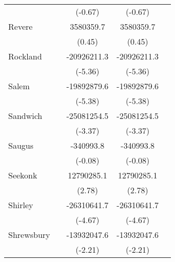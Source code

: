 {\begin{tabular}{l*{4}{c}}
                    &                     &     (-0.67)         &     (-0.67)         &                     \\
\addlinespace
Revere              &                     &   3580359.7         &   3580359.7         &                     \\
                    &                     &      (0.45)         &      (0.45)         &                     \\
\addlinespace
Rockland            &                     & -20926211.3\sym{***}& -20926211.3\sym{***}&                     \\
                    &                     &     (-5.36)         &     (-5.36)         &                     \\
\addlinespace
Salem               &                     & -19892879.6\sym{***}& -19892879.6\sym{***}&                     \\
                    &                     &     (-5.38)         &     (-5.38)         &                     \\
\addlinespace
Sandwich            &                     & -25081254.5\sym{***}& -25081254.5\sym{***}&                     \\
                    &                     &     (-3.37)         &     (-3.37)         &                     \\
\addlinespace
Saugus              &                     &   -340993.8         &   -340993.8         &                     \\
                    &                     &     (-0.08)         &     (-0.08)         &                     \\
\addlinespace
Seekonk             &                     &  12790285.1\sym{**} &  12790285.1\sym{**} &                     \\
                    &                     &      (2.78)         &      (2.78)         &                     \\
\addlinespace
Shirley             &                     & -26310641.7\sym{***}& -26310641.7\sym{***}&                     \\
                    &                     &     (-4.67)         &     (-4.67)         &                     \\
\addlinespace
Shrewsbury          &                     & -13932047.6\sym{*}  & -13932047.6\sym{*}  &                     \\
                    &                     &     (-2.21)         &     (-2.21)         &                     \\

\end{tabular}}
